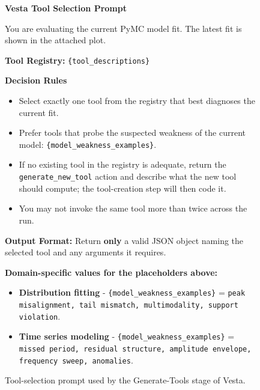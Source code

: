 \documentclass{article}
\newcommand{\method}{{\sc Vesta}}
\begin{document}
\begin{figure}[h]
\small
\begin{mdframed}[linecolor=gray!50, backgroundcolor=gray!5, linewidth=0.8pt]

\textbf{\method{} Tool Selection Prompt}

\medskip
You are evaluating the current PyMC model fit. The latest fit is shown in
the attached plot.

\medskip
\textbf{Tool Registry:} \texttt{\{tool\_descriptions\}}

\medskip
\textbf{Decision Rules}
\begin{itemize}[leftmargin=*, nosep]
    \item Select exactly one tool from the registry that best diagnoses the
          current fit.
    \item Prefer tools that probe the suspected weakness of the current
          model: \texttt{\{model\_weakness\_examples\}}.
    \item If no existing tool in the registry is adequate, return the
          \texttt{generate\_new\_tool} action and describe what the new tool
          should compute; the tool-creation step will then code it.
    \item You may not invoke the same tool more than twice across the run.
\end{itemize}

\medskip
\textbf{Output Format:} Return \textbf{only} a valid JSON object naming the
selected tool and any arguments it requires.

\medskip
\textbf{Domain-specific values for the placeholders above:}
\begin{itemize}[leftmargin=*, nosep]
    \item \textbf{Distribution fitting} -
          \texttt{\{model\_weakness\_examples\}} = \texttt{peak misalignment, tail mismatch, multimodality, support violation}.
    \item \textbf{Time series modeling} -
          \texttt{\{model\_weakness\_examples\}} = \texttt{missed period, residual structure, amplitude envelope, frequency sweep, anomalies}.
\end{itemize}

\end{mdframed}
\caption{Tool-selection prompt used by the Generate-Tools stage of \method{}.}
\label{fig:vesta-tool-selection-prompt}
\end{figure}
\end{document}
